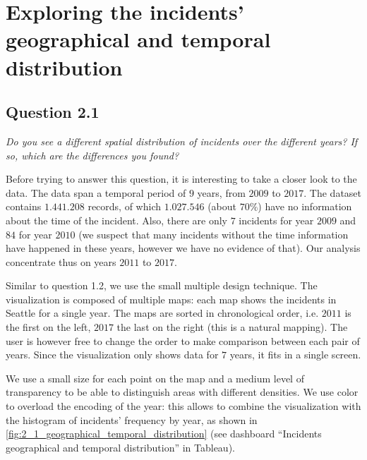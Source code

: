 \section{Exploring the incidents' geographical and temporal distribution}

\subsection*{Question 2.1}
\textit{Do you see a different spatial distribution of incidents over the different years? If so, which are the differences you found?}

Before trying to answer this question, it is interesting to take a closer look to the data.
The data span a temporal period of $9$ years, from $2009$ to $2017$.
The dataset contains $1.441.208$ records, of which $1.027.546$ (about $70\%$) have no information about the time of the incident.
Also, there are only $7$ incidents for year $2009$ and $84$ for year $2010$ (we suspect that many incidents without the time information have happened in these years, however we have no evidence of that).
Our analysis concentrate thus on years $2011$ to $2017$.

Similar to question 1.2, we use the small multiple design technique.
The visualization is composed of multiple maps: each map shows the incidents in Seattle for a single year.
The maps are sorted in chronological order, i.e. $2011$ is the first on the left, $2017$ the last on the right (this is a natural mapping).
The user is however free to change the order to make comparison between each pair of years.
Since the visualization only shows data for $7$ years, it fits in a single screen.

We use a small size for each point on the map and a medium level of transparency to be able to distinguish areas with different densities.
We use color to overload the encoding of the year:
this allows to combine the visualization with the histogram of incidents' frequency by year, as shown in \cref{fig:2_1_geographical_temporal_distribution} (see dashboard ``Incidents geographical and temporal distribution'' in Tableau).

